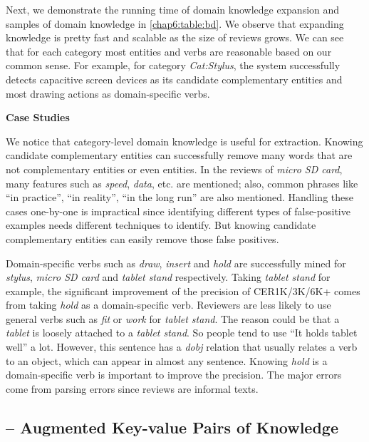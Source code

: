 Next, we demonstrate the running time of domain knowledge expansion and samples of domain knowledge in \ref{chap6:table:bd}. We observe that expanding knowledge is pretty fast and scalable as the size of reviews grows. We can see that for each category most entities and verbs are reasonable based on our common sense. For example, for category \textit{Cat:Stylus}, the system successfully detects capacitive screen devices as its candidate complementary entities and most drawing actions as domain-specific verbs.

\textbf{Case Studies}

We notice that category-level domain knowledge is useful for extraction. Knowing candidate complementary entities can successfully remove many words that are not complementary entities or even entities. In the reviews of \textit{micro SD card}, many features such as \textit{speed}, \textit{data}, etc. are mentioned; also, common phrases like ``in practice'', ``in reality'', ``in the long run'' are also mentioned. Handling these cases one-by-one is impractical since identifying different types of false-positive examples needs different techniques to identify. But knowing candidate complementary entities can easily remove those false positives. 

Domain-specific verbs such as \textit{draw}, \textit{insert} and \textit{hold} are successfully mined for \textit{stylus}, \textit{micro SD card} and \textit{tablet stand} respectively. Taking \textit{tablet stand} for example, the significant improvement of the precision of CER1K/3K/6K+ comes from taking \textit{hold} as a domain-specific verb. Reviewers are less likely to use general verbs such as \textit{fit} or \textit{work} for \textit{tablet stand}. The reason could be that a \textit{tablet} is loosely attached to a \textit{tablet stand}. So people tend to use ``It holds tablet well'' a lot. However, this sentence has a \textit{dobj} relation that usually relates a verb to an object, which can appear in almost any sentence. Knowing \textit{hold} is a domain-specific verb is important to improve the precision. The major errors come from parsing errors since reviews are informal texts.


\subsection{-- Augmented Key-value Pairs of Knowledge}

